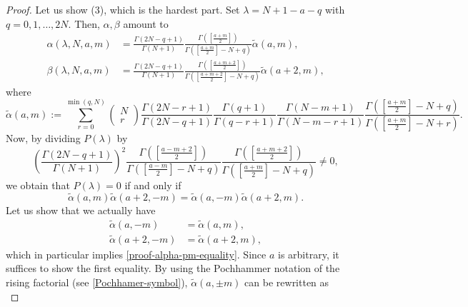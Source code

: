 \documentclass[12pt, pdflatex, a4paper]{article}
\theoremstyle{plain}
\theoremstyle{definition}
\begin{document}
\begin{proof}
Let us show (3), which is the hardest part. Set $\lambda = N+1-a-q$ with $q = 0, 1, \ldots, 2N$. Then, $\alpha, \beta$ amount to
\begin{align*}
\alpha(\lambda, N, a, m) &= \frac{\Gamma(2N-q+1)}{\Gamma(N+1)}\frac{\Gamma(\left[\frac{a+m}{2}\right])}{\Gamma(\left[\frac{a+m}{2}\right] -N + q)}\widetilde{\alpha}(a, m),\\
\beta(\lambda, N, a, m) &= \frac{\Gamma(2N-q+1)}{\Gamma(N+1)}\frac{\Gamma(\left[\frac{a+m+2}{2}\right])}{\Gamma(\left[\frac{a+m+2}{2}\right] -N + q)}\widetilde{\alpha}(a+2, m),
\end{align*}
where
\begin{equation*}
\widetilde{\alpha}(a, m) := \sum_{r=0}^{\min(q,N)}\begin{pmatrix}
N\\
r
\end{pmatrix} 
\frac{\Gamma(2N-r+1)}{\Gamma(2N-q+1)}\frac{\Gamma(q+1)}{\Gamma(q-r+1)}\frac{\Gamma(N-m+1)}{\Gamma(N-m-r+1)}\frac{\Gamma(\left[\frac{a+m}{2}\right] -N + q)}{\Gamma(\left[\frac{a+m}{2}\right] -N + r)}.
\end{equation*}
Now, by dividing $P(\lambda)$ by
\begin{equation}\label{proof-constant-dividing}
\left(\frac{\Gamma(2N-q+1)}{\Gamma(N+1)}\right)^2 \frac{\Gamma(\left[\frac{a-m+2}{2}\right])}{\Gamma(\left[\frac{a-m}{2}\right] -N + q)}\frac{\Gamma(\left[\frac{a+m+2}{2}\right])}{\Gamma(\left[\frac{a+m}{2}\right] -N + q)} \neq 0,
\end{equation}
we obtain that $P(\lambda) = 0$ if and only if 
\begin{equation}\label{proof-alpha-pm-equality}
\widetilde{\alpha}(a, m)\widetilde{\alpha}(a+2, -m) = \widetilde{\alpha}(a, -m)\widetilde{\alpha}(a+2, m).
\end{equation}
Let us show that we actually have
\begin{equation*}
\begin{aligned}
\widetilde{\alpha}(a, -m) &= \widetilde{\alpha}(a, m),\\
\widetilde{\alpha}(a+2, -m) &= \widetilde{\alpha}(a+2, m),
\end{aligned}
\end{equation*}
which in particular implies \eqref{proof-alpha-pm-equality}. Since $a$ is arbitrary, it suffices to show the first equality. By using the Pochhammer notation of the rising factorial (see \eqref{Pochhamer-symbol}), $\widetilde{\alpha}(a, \pm m)$ can be rewritten as
\begin{equation}\label{proof-alpha-hypergeometric}

\end{equation}
\end{proof}
\end{document}
